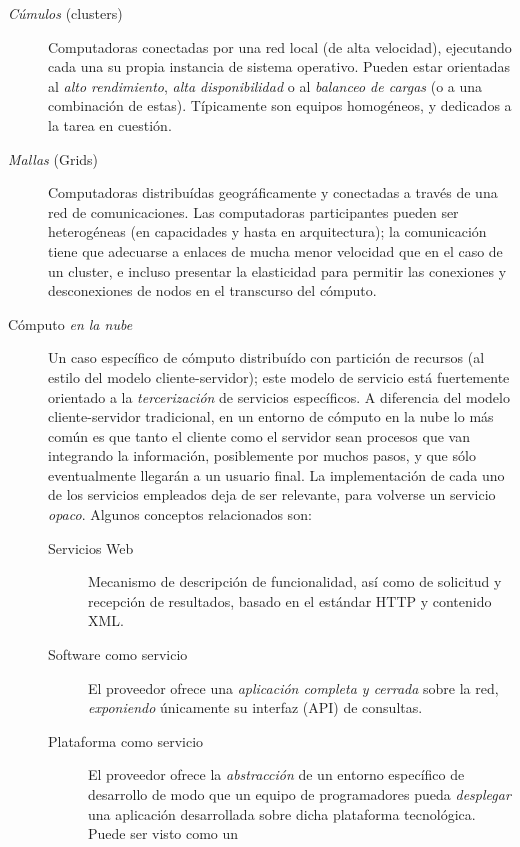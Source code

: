 \documentclass[11pt,fleqn]{book} %
\begin{document}
\begin{description}
\item[\emph{Cúmulos} (clusters)] Computadoras conectadas por una red local
     (de alta velocidad), ejecutando cada una su propia instancia de
     sistema operativo. Pueden estar orientadas al \emph{alto rendimiento},
     \emph{alta disponibilidad} o al \emph{balanceo de cargas} (o a una 
     combinación de estas). Típicamente son equipos homogéneos, y 
     dedicados a la tarea en cuestión.
\item[\emph{Mallas} (Grids)] Computadoras distribuídas geográficamente y
     conectadas a través de una red de comunicaciones. Las
     computadoras participantes pueden ser heterogéneas (en
     capacidades y hasta en arquitectura); la comunicación tiene que
     adecuarse a enlaces de mucha menor velocidad que en el caso de un
     cluster, e incluso presentar la elasticidad para permitir las
     conexiones y desconexiones de nodos en el transcurso del
     cómputo.
\item[Cómputo \emph{en la nube}] Un caso específico de cómputo distribuído
     con partición de recursos (al estilo del modelo
     cliente-servidor); este modelo de servicio está fuertemente
     orientado a la \emph{tercerización} de servicios específicos. A
     diferencia del modelo cliente-servidor tradicional, en un entorno
     de cómputo en la nube lo más común es que tanto el cliente como
     el servidor sean procesos que van integrando la información,
     posiblemente por muchos pasos, y que sólo eventualmente llegarán
     a un usuario final. La implementación de cada uno de los
     servicios empleados deja de ser relevante, para volverse un
     servicio \emph{opaco}. Algunos conceptos relacionados son:
\begin{description}
\item[Servicios Web] Mecanismo de descripción de funcionalidad, así
                     como de solicitud y recepción de resultados,
                     basado en el estándar HTTP y contenido XML.
\item[Software como servicio] El proveedor ofrece una \emph{aplicación        completa y cerrada} sobre la red, \emph{exponiendo} únicamente su
       interfaz (API) de consultas.
\item[Plataforma como servicio] El proveedor ofrece la \emph{abstracción}
       de un entorno específico de desarrollo de modo que un equipo de
       programadores pueda \emph{desplegar} una aplicación desarrollada
       sobre dicha plataforma tecnológica. Puede ser visto como un

\end{description}
\end{description}
\end{document}
